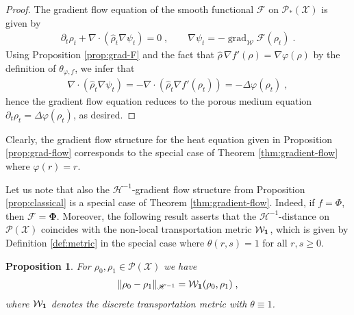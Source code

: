 \documentclass[a4paper,11pt,reqno]{amsart}
\theoremstyle{plain}
\newtheorem{proposition}[theorem]{Proposition}
\theoremstyle{remark}
\numberwithin{equation}{section}
\begin{document}
\begin{proof}
  The gradient flow equation of the smooth functional ${\mathcal{F}}$ on ${{\mathscr{P}}_*({\mathcal{X}})}$
  is given by
\begin{align*}
 \partial_t \rho_t + \nabla \cdot ({\hat\rho}_t \nabla \psi_t) = 0\;,\qquad 
 \nabla \psi_t = - \operatorname{grad}_{\mathcal{W}} {\mathcal{F}}(\rho_t)\;.
\end{align*}
Using Proposition \ref{prop:grad-F} and the fact that ${\hat\rho}\, \nabla
f'(\rho) = \nabla {\varphi}(\rho)$ by the definition of $\theta_{{\varphi},f}$,
we infer that
\begin{align*}
 \nabla \cdot ({\hat\rho}_t \nabla \psi_t)
   = 
 - \nabla \cdot ({\hat\rho}_t \nabla f'(\rho_t))
   = - \Delta {\varphi}(\rho_t)\;,
\end{align*}
hence the gradient flow equation reduces to the porous medium equation
$\partial_t \rho_t =\Delta {\varphi}(\rho_t)$, as desired.
\end{proof}

Clearly, the gradient flow structure for the heat equation given in
Proposition \ref{prop:grad-flow} corresponds to the special case of
Theorem \ref{thm:gradient-flow} where ${\varphi}(r) = r$.

Let us note that also the ${\mathscr{H}}^{-1}$-gradient flow structure from
Proposition \ref{prop:classical} is a special case of Theorem
\ref{thm:gradient-flow}. Indeed, if $f = \Phi$, then ${\mathcal{F}} =
{\boldsymbol{\Phi}}$. Moreover, the following result asserts that the
${\mathscr{H}}^{-1}$-distance on ${{\mathscr{P}}({\mathcal{X}})}$ coincides with the non-local
transportation metric ${\mathcal{W}}_{{{\bf 1}}}$, which is given by Definition
\ref{def:metric} in the special case where $\theta(r,s) = 1$ for all
$r,s \geq 0$.

\begin{proposition}\label{prop:Hminus1}
For $\rho_0, \rho_1 \in {{\mathscr{P}}({\mathcal{X}})}$ we have
\begin{align*}
 \| \rho_0 - \rho_1 \|_{{\mathscr{H}}^{-1}}
   = {\mathcal{W}}_{{{\bf 1}}}(\rho_0, \rho_1)\;, 
\end{align*}
where ${\mathcal{W}}_{{{\bf 1}}}$ denotes the discrete transportation metric with
$\theta \equiv 1$.
\end{proposition}
\end{document}
